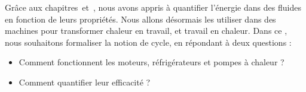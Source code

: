 Grâce aux chapitres~\quatre et~\cinq, nous avons appris à quantifier l’énergie dans des fluides en fonction de leurs propriétés. Nous allons désormais les utiliser dans des machines pour transformer chaleur en travail, et travail en chaleur. Dans ce \courssix, nous souhaitons formaliser la notion de cycle, en répondant à deux questions :
\begin{itemize}
	\item Comment fonctionnent les moteurs, réfrigérateurs et pompes à chaleur ?
	\item Comment quantifier leur efficacité ?
\end{itemize}
